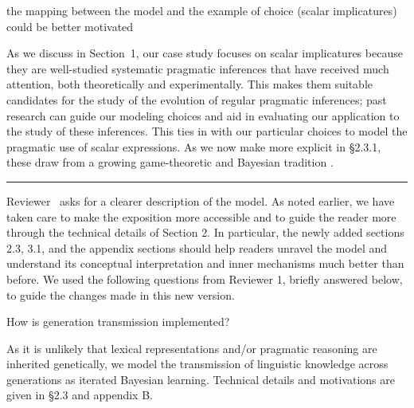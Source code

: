 \documentclass[12pt,a4paper]{article}
\begin{document}
\begin{mdframed}[backgroundcolor=gray!25,linecolor=gray!25,frametitle= Reviewer \thereviewerCounter~comment \thereviewerCommentCounter \hfill ~~({\it modeling choices})]
the mapping between the model and the example of choice (scalar implicatures) could be better motivated
\end{mdframed}

As we discuss in Section~1, our case study focuses on scalar implicatures because they are
well-studied systematic pragmatic inferences that have received much attention, both
theoretically and experimentally. This makes them suitable candidates for the study of the
evolution of regular pragmatic inferences; past research can guide our modeling choices and aid
in evaluating our application to the study of these inferences. This ties in with our
particular choices to model the pragmatic use of scalar expressions. As we now make more
explicit in \S 2.3.1, these draw from a growing game-theoretic and Bayesian tradition
\citep[e.g.,][]{franke:2009,FrankeJager2015:Probabilistic-p,GoodmanFrank2016:Pragmatic-Langu}.

%
\vspace{.75cm}
\noindent\rule{\textwidth}{1pt}
\vspace{.1cm}

\noindent Reviewer \thereviewerCounter~asks for a clearer description of the model. As noted
earlier, we have taken care to make the exposition more accessible and to guide the reader more
through the technical details of Section 2. In particular, the newly added sections 2.3, 3.1,
and the appendix sections should help readers unravel the model and understand its conceptual
interpretation and inner mechanisms much better than before. We used the following questions
from Reviewer 1, briefly answered below, to guide the changes made in this new version.

\vspace{.5cm}
\begin{mdframed}[backgroundcolor=gray!25,linecolor=gray!25]
How is generation transmission implemented?
\end{mdframed}
As it is unlikely that lexical representations and/or pragmatic reasoning are inherited
genetically, we model the transmission of linguistic knowledge across generations as  iterated
Bayesian learning. Technical details and motivations are given in \S 2.3 and appendix B.
\end{document}
